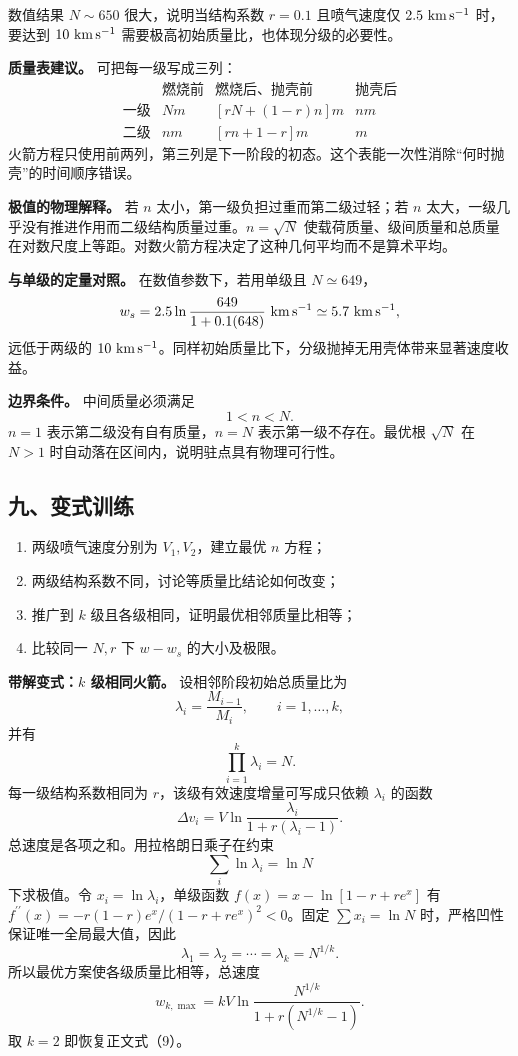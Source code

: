 \documentclass[12pt,a4paper,UTF8]{ctexart}
\newcommand{\tightlist}{\setlength{\itemsep}{0pt}\setlength{\parskip}{0pt}}
\begin{document}
数值结果 \(N\sim650\) 很大，说明当结构系数 \(r=0.1\) 且喷气速度仅
\(2.5\ {\rm km\,s^{-1}}\) 时，要达到 \(10\ {\rm km\,s^{-1}}\)
需要极高初始质量比，也体现分级的必要性。

\textbf{质量表建议。} 可把每一级写成三列： \[
\begin{array}{c|c|c|c}
&\text{燃烧前}&\text{燃烧后、抛壳前}&\text{抛壳后}\\ \hline
\text{一级}&Nm&[rN+(1-r)n]m&nm\\
\text{二级}&nm&[rn+1-r]m&m
\end{array}
\]
火箭方程只使用前两列，第三列是下一阶段的初态。这个表能一次性消除``何时抛壳''的时间顺序错误。

\textbf{极值的物理解释。} 若 \(n\) 太小，第一级负担过重而第二级过轻；若
\(n\) 太大，一级几乎没有推进作用而二级结构质量过重。\(n=\sqrt N\)
使载荷质量、级间质量和总质量在对数尺度上等距。对数火箭方程决定了这种几何平均而不是算术平均。

\textbf{与单级的定量对照。} 在数值参数下，若用单级且 \(N\simeq649\)， \[
w_s=2.5\ln\frac{649}{1+0.1(648)}
\ {\rm km\,s^{-1}}
\simeq5.7\ {\rm km\,s^{-1}},
\] 远低于两级的
\(10\ {\rm km\,s^{-1}}\)。同样初始质量比下，分级抛掉无用壳体带来显著速度收益。

\textbf{边界条件。} 中间质量必须满足 \[
1<n<N.
\] \(n=1\) 表示第二级没有自有质量，\(n=N\) 表示第一级不存在。最优根
\(\sqrt N\) 在 \(N>1\) 时自动落在区间内，说明驻点具有物理可行性。

\subsection{九、变式训练}\label{ux4e5dux53d8ux5f0fux8badux7ec3-1}

\begin{enumerate}
\def\labelenumi{\arabic{enumi}.}
\tightlist
\item
  两级喷气速度分别为 \(V_1,V_2\)，建立最优 \(n\) 方程；
\item
  两级结构系数不同，讨论等质量比结论如何改变；
\item
  推广到 \(k\) 级且各级相同，证明最优相邻质量比相等；
\item
  比较同一 \(N,r\) 下 \(w-w_s\) 的大小及极限。
\end{enumerate}

\textbf{带解变式：\(k\) 级相同火箭。} 设相邻阶段初始总质量比为 \[
\lambda_i=\frac{M_{i-1}}{M_i},
\qquad i=1,\ldots,k,
\] 并有 \[
\prod_{i=1}^k\lambda_i=N. \tag{10}
\] 每一级结构系数相同为 \(r\)，该级有效速度增量可写成只依赖
\(\lambda_i\) 的函数 \[
\Delta v_i
=V\ln\frac{\lambda_i}
{1+r(\lambda_i-1)}. \tag{11}
\] 总速度是各项之和。用拉格朗日乘子在约束 \[
\sum_i\ln\lambda_i=\ln N
\] 下求极值。令 \(x_i=\ln\lambda_i\)，单级函数 \(f(x)=x-\ln[1-r+re^x]\)
有 \(f^{\prime\prime}(x)=-r(1-r)e^x/(1-r+re^x)^2<0\)。固定
\(\sum x_i=\ln N\) 时，严格凹性保证唯一全局最大值，因此 \[
\lambda_1=\lambda_2=\cdots=\lambda_k=N^{1/k}. \tag{12}
\] 所以最优方案使各级质量比相等，总速度 \[
\boxed{
w_{k,\max}
=kV\ln
\frac{N^{1/k}}
{1+r(N^{1/k}-1)}
}. \tag{13}
\] 取 \(k=2\) 即恢复正文式（9）。
\end{document}
